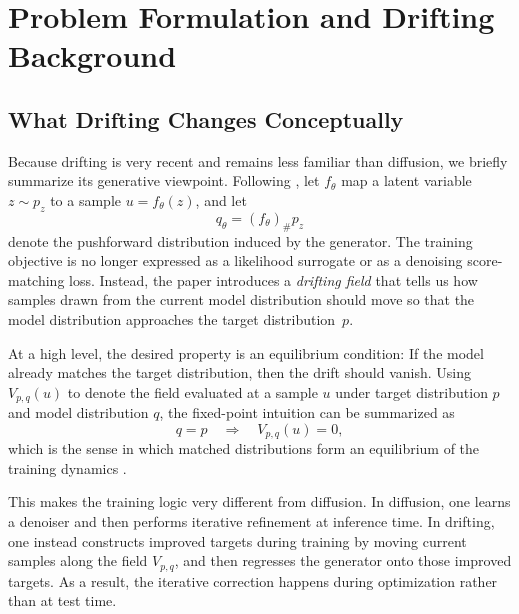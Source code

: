 \documentclass[conference]{IEEEtran}
\begin{document}
\section{Problem Formulation and Drifting Background}
\subsection{What Drifting Changes Conceptually}
Because drifting is very recent and remains less familiar than diffusion, we briefly summarize its generative viewpoint.
Following \cite{drifting}, let \(f_\theta\) map a latent variable \(z \sim p_z\) to a sample \(u = f_\theta(z)\), and let
\begin{equation}
q_\theta = (f_\theta)_\# p_z
\end{equation}
denote the pushforward distribution induced by the generator.
The training objective is no longer expressed as a likelihood surrogate or as a denoising score-matching loss.
Instead, the paper introduces a \emph{drifting field} that tells us how samples drawn from the current model distribution should move so that the model distribution approaches the target distribution~\(p\).

At a high level, the desired property is an equilibrium condition:
If the model already matches the target distribution, then the drift should vanish.
Using \(V_{p,q}(u)\) to denote the field evaluated at a sample \(u\) under target distribution \(p\) and model distribution \(q\), the fixed-point intuition can be summarized as
\begin{equation}
q = p
\quad \Longrightarrow \quad
V_{p,q}(u) = 0,
\end{equation}
which is the sense in which matched distributions form an equilibrium of the training dynamics \cite{drifting}.

This makes the training logic very different from diffusion.
In diffusion, one learns a denoiser and then performs iterative refinement at inference time.
In drifting, one instead constructs improved targets during training by moving current samples along the field \(V_{p,q}\), and then regresses the generator onto those improved targets.
As a result, the iterative correction happens during optimization rather than at test time.
\end{document}
